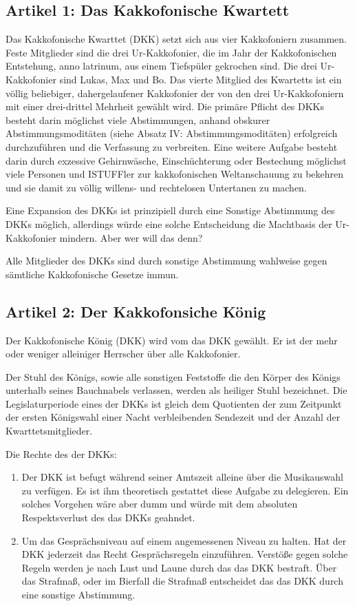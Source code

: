 \documentclass[ngerman, fontsize=12pt, parskip=half, footsepline]{scrartcl}
\begin{document}
\subsection*{Artikel 1: Das Kakkofonische Kwartett}
Das Kakkofonische Kwarttet (DKK) setzt sich aus vier Kakkofoniern zusammen. Feste Mitglieder sind die drei Ur-Kakkofonier, die im Jahr der Kakkofonischen Entstehung, anno latrinum, aus einem Tiefspüler gekrochen sind. Die drei Ur-Kakkofonier sind Lukas, Max und Bo. Das vierte Mitglied des Kwartetts ist ein völlig beliebiger, dahergelaufener Kakkofonier der von den drei Ur-Kakkofoniern mit einer drei-drittel Mehrheit gewählt wird. Die primäre Pflicht des DKKs besteht darin möglichst viele Abstimmungen, anhand obskurer Abstimmungsmoditäten (siehe Absatz IV: Abstimmungsmoditäten) erfolgreich durchzuführen und die Verfassung zu verbreiten. Eine weitere Aufgabe besteht darin durch exzessive Gehirnwäsche, Einschüchterung oder Bestechung möglichst viele Personen und ISTUFFler zur kakkofonischen Weltanschauung zu bekehren und sie damit zu völlig willens- und rechtelosen Untertanen zu machen.

Eine Expansion des DKKs ist prinzipiell durch eine Sonstige Abstimmung des DKKs möglich, allerdings würde eine solche Entscheidung die Machtbasis der Ur-Kakkofonier mindern. Aber wer will das denn?

Alle Mitglieder des DKKs sind durch sonstige Abstimmung wahlweise gegen sämtliche Kakkofonische Gesetze immun.

\subsection*{Artikel 2: Der Kakkofonsiche König}
Der Kakkofonische König (DKK) wird vom das DKK gewählt. Er ist der mehr oder weniger alleiniger Herrscher über alle Kakkofonier.

Der Stuhl des Königs, sowie alle sonstigen Feststoffe die den Körper des Königs unterhalb seines Bauchnabels verlassen, werden als heiliger Stuhl bezeichnet.
Die Legislaturperiode eines der DKKs  ist gleich dem Quotienten der zum Zeitpunkt der ersten Königswahl einer Nacht verbleibenden Sendezeit und der Anzahl der Kwarttetsmitglieder.

Die Rechte des der DKKs:
\begin{enumerate}
	\item Der DKK ist befugt während seiner Amtszeit alleine über die Musikauswahl zu verfügen. Es 	ist ihm theoretisch gestattet diese Aufgabe zu delegieren. Ein solches Vorgehen wäre aber dumm und würde mit dem absoluten Respektsverlust des das DKKs geahndet.

	\item Um das Gesprächsniveau auf einem angemessenen Niveau zu halten. Hat der DKK jederzeit das Recht Gesprächsregeln einzuführen. Verstöße gegen solche Regeln werden je nach Lust und Laune durch das das DKK bestraft. Über das Strafmaß, oder im Bierfall die Strafmaß entscheidet das das DKK durch eine sonstige Abstimmung.
\end{enumerate}
\end{document}
